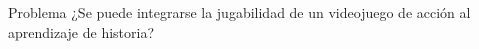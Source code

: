 \begin{section}{Problema}
  ¿Se puede integrarse la jugabilidad de un videojuego de acción al aprendizaje de historia?
\end{section}

